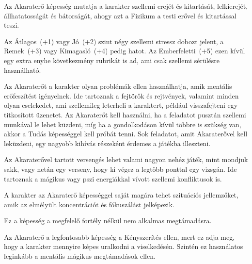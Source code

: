 
Az Akaraterő képesség mutatja a karakter szellemi erejét és kitartását, lelkierejét, állhatatosságát és bátorságát, ahogy azt a Fizikum a testi erővel és kitartással teszi.

Az Átlagos~(+1) vagy Jó~(+2) szint négy szellemi stressz dobozt jelent, a Remek~(+3) vagy Kimagasló~(+4) pedig hatot. Az Emberfeletti~(+5) ezen kívül egy extra enyhe következmény rubrikát is ad, ami csak szellemi sérülésre használható.

\overcome Az Akaraterőt a karakter olyan problémák ellen használhatja, amik mentális erőfeszítést igényelnek. Ide tartoznak a fejtörők és rejtvények, valamint minden olyan cselekedet, ami szellemileg leterheli a karaktert, például visszafejteni egy titkosított üzenetet. Az Akaraterőt kell használni, ha a feladatot pusztán szellemi munkával le lehet küzdeni, míg ha a gondolkodáson kívül többre is szükség van, akkor a Tudás képességgel kell próbát tenni. Sok feladatot, amit Akaraterővel kell leküzdeni, egy nagyobb kihívás részeként érdemes a játékba illeszteni.

Az Akaraterővel tartott versengés lehet valami nagyon nehéz játék, mint mondjuk sakk, vagy netán egy verseny, hogy ki végez a legtöbb ponttal egy vizsgán. Ide tartoznak a mágikus vagy pszi energiákkal vívott szellemi konfliktusok is.

\advantage A karakter az Akaraterő képességgel saját magára tehet szituációs jellemzőket, amik az elmélyült koncentrációt és fókuszálást jelképezik.

\noindent Ez a képesség a megfelelő fortély nélkül nem alkalmas  megtámadásra.

 Az Akaraterő a legfontosabb képesség a Kényszerítés ellen, mert ez adja meg, hogy a karakter mennyire képes uralkodni a viselkedésén. Szintén ez használatos leginkább a mentális mágikus megtámadások ellen.



